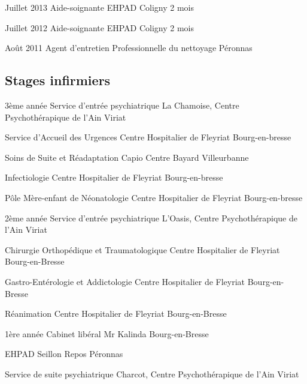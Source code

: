 \documentclass[10pt,a4paper]{moderncv}
\begin{document}
\cventry
	{Juillet 2013}
	{Aide-soignante}
	{EHPAD}
	{Coligny}
	{}
	{2 mois}

\cventry
    {Juillet 2012}
	{Aide-soignante}
	{EHPAD}
	{Coligny}
	{}
	{2 mois}

\cventry
	{Août 2011}
	{Agent d'entretien}
	{Professionnelle du nettoyage}
	{Péronnas}
	{}
	{}

\vspace*{3mm}

\subsection{Stages infirmiers}
	
\cventry
	{3ème année}
	{Service d'entrée psychiatrique}
	{La Chamoise, Centre Psychothérapique de l’Ain}
	{Viriat}
	{}
	{}

\cventry
	{}
	{Service d’Accueil des Urgences}
	{Centre Hospitalier de Fleyriat}
	{Bourg-en-bresse}
	{}
	{}

\cventry
	{}
	{Soins de Suite et Réadaptation}
	{Capio Centre Bayard}
	{Villeurbanne}
	{}
	{}

\cventry
	{}
	{Infectiologie}
	{Centre Hospitalier de Fleyriat}
	{Bourg-en-bresse}
	{}
	{}

\cventry
	{}
	{Pôle Mère-enfant de Néonatologie}
	{Centre Hospitalier de Fleyriat}
	{Bourg-en-bresse}
	{}
	{}

\vspace*{3mm}

\cventry
	{2ème année}
	{Service d’entrée psychiatrique}
	{L'Oasis, Centre Psychothérapique de l’Ain}
	{Viriat}
	{}
	{}

\cventry
	{}
	{Chirurgie Orthopédique et Traumatologique}
	{Centre Hospitalier de Fleyriat}
	{Bourg-en-Bresse}
	{}
	{}

\cventry
	{}
	{Gastro-Entérologie et Addictologie}
    {Centre Hospitalier de Fleyriat}
	{Bourg-en-Bresse}
	{}
	{}

\cventry
	{}
	{Réanimation}
	{Centre Hospitalier de Fleyriat}
	{Bourg-en-Bresse}
	{}
	{}

\vspace*{3mm}

\cventry
	{1ère année}
	{Cabinet libéral}
	{Mr Kalinda}
	{Bourg-en-Bresse}
	{}
	{}

\cventry
	{}
	{EHPAD}
	{Seillon Repos}
	{Péronnas}
	{}
	{}

\cventry
	{}
	{Service de suite psychiatrique}
	{Charcot, Centre Psychothérapique de l’Ain}
	{Viriat}
	{}
	{}
\end{document}
